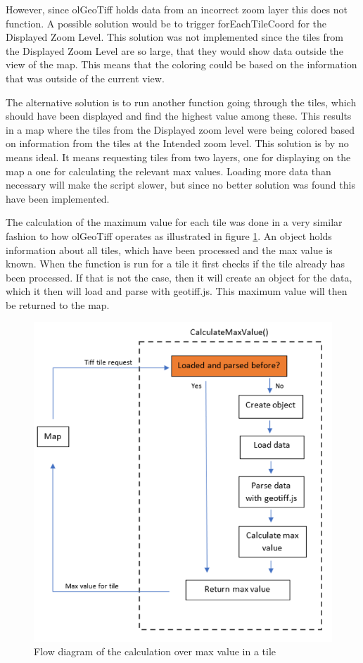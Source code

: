 However, since olGeoTiff holds data from an incorrect zoom layer this does not function. A possible solution would be to trigger forEachTileCoord for the Displayed Zoom Level. This solution was not implemented since the tiles from the Displayed Zoom Level are so large, that they would show data outside the view of the map. This means that the coloring could be based on the information that was outside of the current view.

The alternative solution is to run another function going through the tiles, which should have been displayed and find the highest value among these. This results in a map where the tiles from the Displayed zoom level were being colored based on information from the tiles at the Intended zoom level. This solution is by no means ideal. It means requesting tiles from two layers, one for displaying on the map a one for calculating the relevant max values. Loading more data than necessary will make the script slower, but since no better solution was found this have been implemented.

The calculation of the maximum value for each tile was done in a very similar fashion to how olGeoTiff operates as illustrated in figure \ref{CalculateMaxValue}. An object holds information about all tiles, which have been processed and the max value is known. When the function is run for a tile it first checks if the tile already has been processed. If that is not the case, then it will create an object for the data, which it then will load and parse with geotiff.js. %
This maximum value will then be returned to the map. 

\begin{figure} [H]
	\centering
	\includegraphics[width=.6\textwidth]{Pictures/CalculateMaxValue}
	\caption{Flow diagram of the calculation over max value in a tile}
	\label{CalculateMaxValue}
\end{figure}



